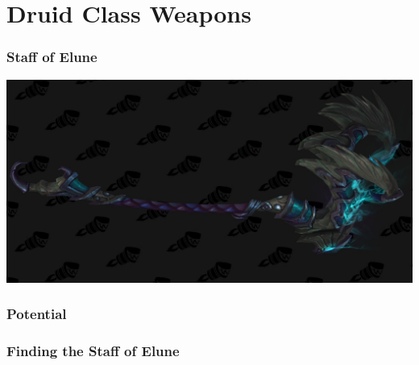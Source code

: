\section{Druid Class Weapons}

\subsubsection{Staff of Elune}


\begin{center}
	\includegraphics[width=\linewidth]{img/weapons/554329.jpg}
\end{center}

\subsubsection{Potential}



\subsubsection{Finding the Staff of Elune}